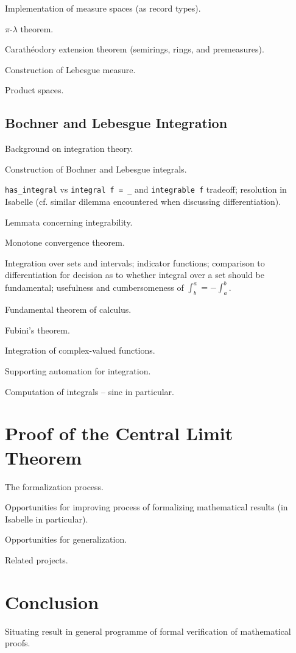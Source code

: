 \documentclass{amsart}
\theoremstyle{definition}
\theoremstyle{remark}
\begin{document}
Implementation of measure spaces (as record types).

$\pi$-$\lambda$ theorem.

Carath\'eodory extension theorem (semirings, rings, and premeasures).

Construction of Lebesgue measure.

Product spaces.

\subsection{Bochner and Lebesgue Integration}

Background on integration theory.

Construction of Bochner and Lebesgue integrals.

\texttt{has\_integral} vs \texttt{integral f = \_} and \texttt{integrable f} tradeoff; resolution in Isabelle (cf. similar dilemma encountered when discussing differentiation).

Lemmata concerning integrability.

Monotone convergence theorem.

Integration over sets and intervals; indicator functions; comparison to differentiation for decision as to whether integral over a set should be fundamental; usefulness and cumbersomeness of $\int_b^a = - \int_a^b$.

Fundamental theorem of calculus.

Fubini's theorem.

Integration of complex-valued functions.

Supporting automation for integration.

Computation of integrals -- sinc in particular.

\section{Proof of the Central Limit Theorem} \label{Proof}

The formalization process.

Opportunities for improving process of formalizing mathematical results (in Isabelle in particular).

Opportunities for generalization.

Related projects.

\section{Conclusion} \label{End}

Situating result in general programme of formal verification of mathematical proofs.



\end{document}
